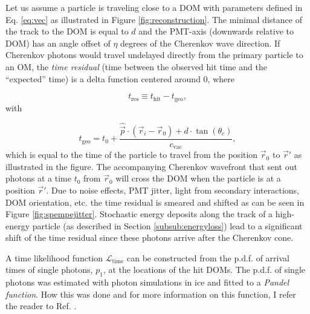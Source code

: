 Let us assume a particle is traveling close to a DOM with parameters defined in Eq. \ref{eq:vec} as illustrated in Figure \ref{fig:reconstruction}. The minimal distance of the track to the DOM is equal to $d$ and the PMT-axis (downwards relative to DOM) has an angle offset of $\eta$ degrees of the Cherenkov wave direction. If Cherenkov photons would travel undelayed directly from the primary particle to an OM, the \textit{time residual} (time between the observed hit time and the ``expected'' time) is a delta function centered around 0, where

\begin{equation}
t_{\textrm{res}} \equiv t_{\textrm{hit}} - t_{\textrm{geo}},
\end{equation}
\noindent with

\begin{equation}
t_\textrm{geo} = t_0 + \frac{\hat{\vec{p}} \cdot (\vec{r}_i - \vec{r}_0) + d\cdot \tan (\theta_c)}{c_\textrm{vac}},
\end{equation}
\noindent which is equal to the time of the particle to travel from the position $\vec{r}_0$ to $\vec{r}'$ as illustrated in the figure. The accompanying Cherenkov wavefront that sent out photons at a time $t_0$ from $\vec{r}_0$ will cross the DOM when the particle is at a position $\vec{r}'$. Due to noise effects, PMT jitter, light from secondary interactions, DOM orientation, etc. the time residual is smeared and shifted as can be seen in Figure \ref{fig:spempejitter}. Stochastic energy deposits along the track of a high-energy particle (as described in Section \ref{subsub:energyloss}) lead to a significant shift of the time residual since these photons arrive after the Cherenkov cone.

A time likelihood function $\mathcal{L}_\textrm{time}$ can be constructed from the p.d.f. of arrival times of single photons, $p_1$, at the locations of the hit DOMs. The p.d.f. of single photons was estimated with photon simulations in ice and fitted to a \textit{Pandel function}. How this was done and for more information on this function, I refer the reader to Ref. \cite{Ahrens:2003fg}. 

